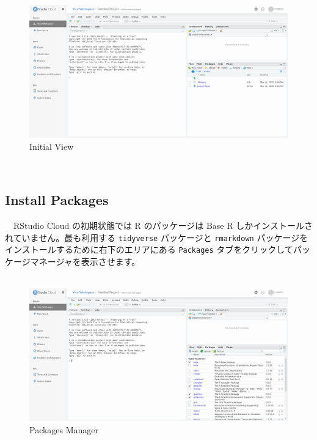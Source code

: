 \documentclass[
  12pt,
]{book}
\begin{document}
\begin{figure}[H]

{\centering \includegraphics[width=0.8\linewidth,]{fig/RStudio/RSCloud_01} 

}

\caption{Initial View}\label{fig:unnamed-chunk-140}
\end{figure}

　

\hypertarget{install-packages}{%
\subsection{Install Packages}\label{install-packages}}

　RStudio Cloud の初期状態では R のパッケージは Base R しかインストールされていません。最も利用する \texttt{tidyverse} パッケージと \texttt{rmarkdown} パッケージをインストールするために右下のエリアにある \texttt{Packages} タブをクリックしてパッケージマネージャを表示させます。\\
　\\

\begin{figure}[H]

{\centering \includegraphics[width=0.8\linewidth,]{fig/RStudio/RSCloud_02} 

}

\caption{Packages Manager}\label{fig:unnamed-chunk-141}
\end{figure}
\end{document}

